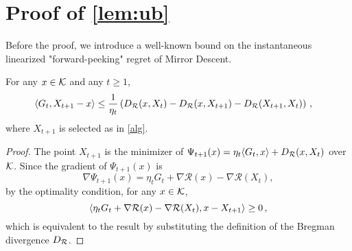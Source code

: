 \section{Proof of \cref{lem:ub}}
\label{sec:lemub-proof}
\label{sec:ublemma-proof}
Before the proof, we introduce a well-known bound on the instantaneous linearized "forward-peeking" regret of Mirror Descent.
\begin{lemma}
\label{lem:mdlinregret}
For any $x \in \mathcal{K}$ and any $t \ge 1$,
\begin{align*}
\MoveEqLeft
\ip{G_t, X_{t+1}-x}
\le \dfrac{1}{\eta_t} \left( \DR(x,X_t)-\DR(x,X_{t+1})-\DR(X_{t+1},X_t) \right)\,,
\end{align*}
where $X_{t+1}$ is selected as in \cref{alg}.
\end{lemma}
\begin{proof}
The point $X_{t+1}$ is the minimizer of
$\Psi_{t+1}(x)=\eta_t \langle G_t,x \rangle+D_{\mathcal{R}}(x,X_t)$ over $\mathcal{K}$. Since the gradient of $\Psi_{t+1}(x)$ is
\[
\nabla \Psi_{t+1}(x) = \eta_t G_t + \nabla\mathcal{R}(x)-\nabla\mathcal{R}(X_t),
\]
by the optimality condition, for any $x \in \mathcal{K}$,
\[
\langle \eta_t G_t + \nabla\mathcal{R}(x)-\nabla\mathcal{R}(X_t), x-X_{t+1} \rangle\ge 0 \,,
\]
which is equivalent to the result by substituting the definition of the Bregman divergence $D_{\mathcal{R}}$.
\end{proof}

